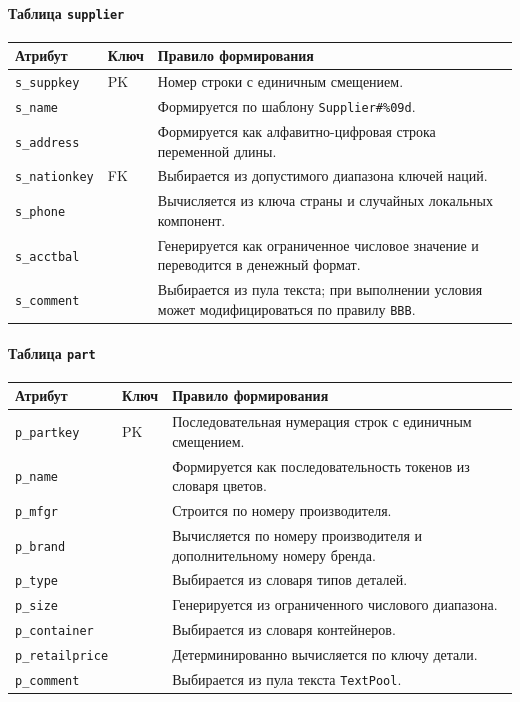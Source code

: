 \paragraph{Таблица \texttt{supplier}}
\begin{center}
\small
\begin{tabular}{|p{}|p{}|p{}|}
\hline
\textbf{Атрибут} & \textbf{Ключ} & \textbf{Правило формирования} \\
\hline
\texttt{s\_suppkey} & PK & Номер строки с единичным смещением. \\
\hline
\texttt{s\_name} &  & Формируется по шаблону \texttt{Supplier\#\%09d}. \\
\hline
\texttt{s\_address} &  & Формируется как алфавитно-цифровая строка переменной длины. \\
\hline
\texttt{s\_nationkey} & FK & Выбирается из допустимого диапазона ключей наций. \\
\hline
\texttt{s\_phone} &  & Вычисляется из ключа страны и случайных локальных компонент. \\
\hline
\texttt{s\_acctbal} &  & Генерируется как ограниченное числовое значение и переводится в денежный формат. \\
\hline
\texttt{s\_comment} &  & Выбирается из пула текста; при выполнении условия может модифицироваться по правилу \texttt{BBB}. \\
\hline
\end{tabular}
\end{center}

\paragraph{Таблица \texttt{part}}
\begin{center}
\small
\begin{tabular}{|p{}|p{}|p{}|}
\hline
\textbf{Атрибут} & \textbf{Ключ} & \textbf{Правило формирования} \\
\hline
\texttt{p\_partkey} & PK & Последовательная нумерация строк с единичным смещением. \\
\hline
\texttt{p\_name} &  & Формируется как последовательность токенов из словаря цветов. \\
\hline
\texttt{p\_mfgr} &  & Строится по номеру производителя. \\
\hline
\texttt{p\_brand} &  & Вычисляется по номеру производителя и дополнительному номеру бренда. \\
\hline
\texttt{p\_type} &  & Выбирается из словаря типов деталей. \\
\hline
\texttt{p\_size} &  & Генерируется из ограниченного числового диапазона. \\
\hline
\texttt{p\_container} &  & Выбирается из словаря контейнеров. \\
\hline
\texttt{p\_retailprice} &  & Детерминированно вычисляется по ключу детали. \\
\hline
\texttt{p\_comment} &  & Выбирается из пула текста \texttt{TextPool}. \\
\hline
\end{tabular}
\end{center}

